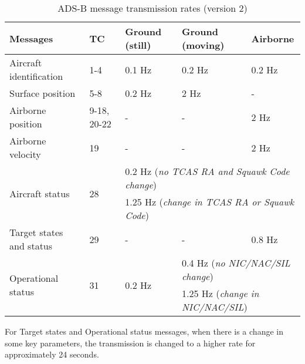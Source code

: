 \begin{table}[ht]
  \footnotesize
  \centering
  \caption{ADS-B message transmission rates (version 2)}
  \label{tb:adsb-transmission-rate}
  \begin{tabular}{|l|l|l|l|l|}
  \hline
  \textbf{Messages} & \textbf{TC} & \textbf{Ground (still)} & \textbf{Ground (moving)} & \textbf{Airborne} \\ \hline
  Aircraft identification & 1-4 & 0.1 Hz & 0.2 Hz & 0.2 Hz \\ \hline
  Surface position & 5-8 & 0.2 Hz & 2 Hz & - \\ \hline
  Airborne position & 9-18, 20-22 & - & - & 2 Hz \\ \hline
  Airborne velocity & 19 & - & - & 2 Hz \\ \hline
  \multirow{2}{*}{Aircraft status} & \multirow{2}{*}{28} & \multicolumn{3}{l|}{0.2 Hz (\textit{no TCAS RA and Squawk Code change})} \\ \cline{3-5} 
   &  & \multicolumn{3}{l|}{1.25 Hz (\textit{change in TCAS RA or Squawk Code})} \\ \hline
  Target states and status & 29 & - & - & 0.8 Hz \\ \hline
  \multirow{2}{*}{Operational status} & \multirow{2}{*}{31} & \multirow{2}{*}{0.2 Hz} & \multicolumn{2}{l|}{0.4 Hz (\textit{no NIC/NAC/SIL change})} \\ \cline{4-5} 
   &  &  & \multicolumn{2}{l|}{1.25 Hz (\textit{change in NIC/NAC/SIL})} \\ \hline
  \end{tabular}
\end{table}

For Target states and Operational status messages, when there is a change in some key parameters, the transmission is changed to a higher rate for approximately 24 seconds.


